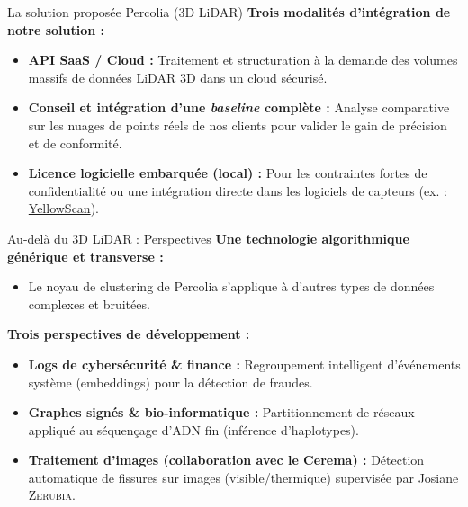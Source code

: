 \documentclass[A4,svgnames,9pt,aspectratio=169]{beamer}
\begin{document}
\begin{frame}{La solution proposée Percolia (3D LiDAR)}
    \textbf{\bleu Trois modalités d'intégration de notre solution :}
    
    \vspace{0.6cm}
    \begin{itemize}
        \setlength{\itemsep}{1.2em}
        \item \textbf{API SaaS / Cloud :} Traitement et structuration à la demande des volumes massifs de données LiDAR 3D dans un cloud sécurisé.
        \item \textbf{Conseil et intégration d'une \emph{baseline} complète :} Analyse comparative sur les nuages de points réels de nos clients pour valider le gain de précision et de conformité.
        \item \textbf{Licence logicielle embarquée (local) :} Pour les contraintes fortes de confidentialité ou une intégration directe dans les logiciels de capteurs (ex. : \href{https://www.yellowscan.com/}{YellowScan}).
    \end{itemize}
\end{frame}

\begin{frame}{Au-delà du 3D LiDAR : Perspectives}
    \textbf{\bleu Une technologie algorithmique générique et transverse :}
    \begin{itemize}
        \item Le noyau de clustering de Percolia s'applique à d'autres types de données complexes et bruitées.
    \end{itemize}

    \vspace{0.2cm}

    \textbf{\bleu Trois perspectives de développement :}
    \begin{itemize}
        \item \textbf{Logs de cybersécurité \& finance :} Regroupement intelligent d'événements système (embeddings) pour la détection de fraudes.
        \item \textbf{Graphes signés \& bio-informatique :} Partitionnement de réseaux appliqué au séquençage d'ADN fin (inférence d'haplotypes).
        \item \textbf{Traitement d'images (collaboration avec le Cerema) :} Détection automatique de fissures sur images (visible/thermique) supervisée par Josiane \textsc{Zerubia}.
    \end{itemize}
\end{frame}
\end{document}
